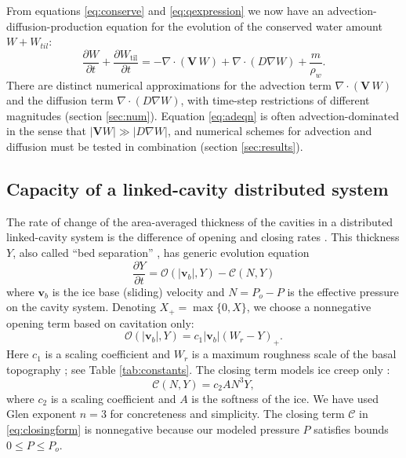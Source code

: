 \documentclass[gmd]{copernicus}   %
\newcommand{\text}{\textrm}
\newcommand\bv{\mathbf{v}}
\newcommand\bV{\mathbf{V}}
\newcommand{\Div}{\nabla\cdot}
\newcommand{\grad}{\nabla}
\newcommand{\Wtil}{W_{\text{til}}}
\begin{document}
From equations \eqref{eq:conserve} and \eqref{eq:qexpression} we now have an advection-diffusion-production equation for the evolution of the conserved water amount $W+W_{til}$:
\begin{equation} \label{eq:adeqn}
  \frac{\partial W}{\partial t} + \frac{\partial \Wtil}{\partial t} = - \Div\left(\bV\, W\right) + \Div \left(D \grad W\right) + \frac{m}{\rho_w}.
\end{equation}
There are distinct numerical approximations for the advection term $\Div\left(\bV\, W\right)$ and the diffusion term $\Div \left(D \grad W\right)$, with time-step restrictions of different magnitudes (section \ref{sec:num}).  Equation \eqref{eq:adeqn} is often advection-dominated in the sense that $|\bV W| \gg |D \grad W|$, and numerical schemes for advection and diffusion must be tested in combination (section \ref{sec:results}).

\subsection{Capacity of a linked-cavity distributed system}  \label{subsec:cavities}  The rate of change of the area-averaged thickness of the cavities in a distributed linked-cavity system is the difference of opening and closing rates \citep{Hewitt2011}.  This thickness $Y$, also called ``bed separation'' \citep{Bartholomausetal2011}, has generic evolution equation
\begin{equation}
\frac{\partial Y}{\partial t} = \mathcal{O}(|\bv_b|,Y) - \mathcal{C}(N,Y) \label{eq:hewittcapacity}
\end{equation}
where $\bv_b$ is the ice base (sliding) velocity and $N=P_o-P$ is the effective pressure on the cavity system.  Denoting $X_+= \max\{0,X\}$, we choose a nonnegative opening term based on cavitation only:
\begin{equation}
\mathcal{O}(|\bv_b|,Y) = c_1 |\bv_b| (W_r - Y)_+. \label{eq:openingform}
\end{equation}
Here $c_1$ is a scaling coefficient and $W_r$ is a maximum roughness scale of the basal topography \citep{Schoofetal2012}; see Table \ref{tab:constants}.  The closing term models ice creep only \citep{Hewitt2011,Schoofetal2012}:
\begin{equation}
\mathcal{C}(N,Y) = c_2 A N^3 Y, \label{eq:closingform}
\end{equation}
where $c_2$ is a scaling coefficient and $A$ is the softness of the ice.  We have used Glen exponent $n=3$ for concreteness and simplicity.  The closing term $\mathcal{C}$ in \eqref{eq:closingform} is nonnegative because our modeled pressure $P$ satisfies bounds $0\le P \le P_o$.
\end{document}
